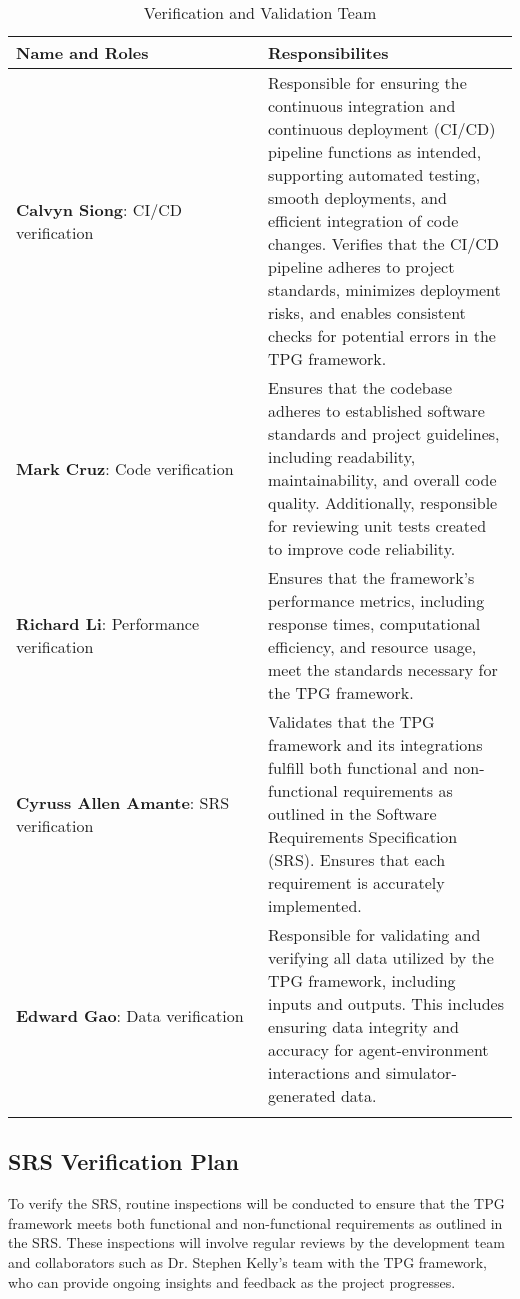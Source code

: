 \documentclass[12pt, titlepage]{article}
\begin{document}
\begin{longtable}{|p{0.5\linewidth}|p{0.5\linewidth}|}
  \toprule {\bf Name and Roles} & {\bf Responsibilites}\\
  \hline
  {\bf Calvyn Siong}: CI/CD verification & Responsible for ensuring the continuous integration and continuous deployment (CI/CD) pipeline functions as intended, supporting automated testing, smooth deployments, and efficient integration of code changes. Verifies that the CI/CD pipeline adheres to project standards, minimizes deployment risks, and enables consistent checks for potential errors in the TPG framework.\\
  \hline
  {\bf Mark Cruz}: Code verification & Ensures that the codebase adheres to established software standards and project guidelines, including readability, maintainability, and overall code quality. Additionally, responsible for reviewing unit tests created to improve code reliability.\\
  \hline

  {\bf Richard Li}: Performance verification &Ensures that the framework’s performance metrics, including response times, computational efficiency, and resource usage, meet the standards necessary for the TPG framework. \\
  \hline

  {\bf Cyruss Allen Amante}: SRS verification &Validates that the TPG framework and its integrations fulfill both functional and non-functional requirements as outlined in the Software Requirements Specification (SRS). Ensures that each requirement is accurately implemented.\\
  \hline
  {\bf Edward Gao}: Data verification & Responsible for validating and verifying all data utilized by the TPG framework, including inputs and outputs. This includes ensuring data integrity and accuracy for agent-environment interactions and simulator-generated data.\\
  \bottomrule
  \caption{Verification and Validation Team}
  \label{team}
\end{longtable}


\subsection{SRS Verification Plan}

To verify the SRS, routine inspections will be conducted to ensure that the TPG framework meets both functional and non-functional requirements as outlined in the SRS. These inspections will involve regular reviews by the development team and collaborators such as Dr. Stephen Kelly’s team with the TPG framework, who can provide ongoing insights and feedback as the project progresses. 
\end{document}
